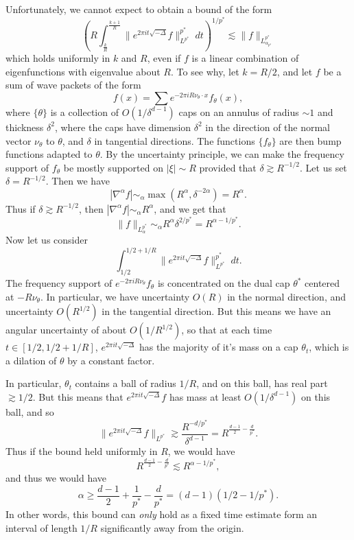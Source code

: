 \begin{itemize}
    Unfortunately, we cannot expect to obtain a bound of the form
    \[ \left( R \int_{\frac{k}{R}}^{\frac{k + 1}{R}} \| e^{2 \pi i t \sqrt{-\Delta}} f \|_{L^{p^*}}^{p^*}\; dt \right)^{1/p^*} \lesssim \| f \|_{L^{p^*}_{\alpha_{p^*}}} \]
    which holds uniformly in $k$ and $R$, even if $f$ is a linear combination of eigenfunctions with eigenvalue about $R$. To see why, let $k = R/2$, and let $f$ be a sum of wave packets of the form
    \[ f(x) = \sum e^{- 2 \pi i R \nu_\theta \cdot x} f_\theta(x), \]
    where $\{ \theta \}$ is a collection of $O(1/\delta^{d-1})$ caps on an annulus of radius $\sim 1$ and thickness $\delta^2$, where the caps have dimension $\delta^2$ in the direction of the normal vector $\nu_\theta$ to $\theta$, and $\delta$ in tangential directions. The functions $\{ f_\theta \}$ are then bump functions adapted to $\theta$. By the uncertainty principle, we can make the frequency support of $f_\theta$ be mostly supported on $|\xi| \sim R$ provided that $\delta \gtrsim R^{-1/2}$. Let us set $\delta = R^{-1/2}$. Then we have
    \[ |\nabla^\alpha f| \sim_\alpha \max(R^\alpha,\delta^{-2\alpha}) = R^\alpha. \]
    Thus if $\delta \gtrsim R^{-1/2}$, then $|\nabla^\alpha f| \sim_\alpha R^\alpha$, and we get that
    \[ \| f \|_{L^{p^*}_\alpha} \sim_\alpha R^\alpha \delta^{2/p^*} = R^{\alpha - 1/p^*}. \]
    Now let us consider
    \[ \int_{1/2}^{1/2 + 1/R} \| e^{2 \pi i t \sqrt{-\Delta}} f \|_{L^{p^*}}^{p^*}\; dt. \]
    The frequency support of $e^{-2 \pi i R \nu_\theta} f_\theta$ is concentrated on the dual cap $\theta^*$ centered at $-  R \nu_\theta$. In particular, we have uncertainty $O(R)$ in the normal direction, and uncertainty $O(R^{1/2})$ in the tangential direction. But this means we have an angular uncertainty of about $O(1/R^{1/2})$, so that at each time $t \in [1/2, 1/2 + 1/R]$, $e^{2 \pi i t \sqrt{-\Delta}}$ has the majority of it's mass on a cap $\theta_t$, which is a dilation of $\theta$ by a constant factor.

    In particular, $\theta_t$ contains a ball of radius $1/R$, and on this ball, has real part $\gtrsim 1/2$. But this means that $e^{2 \pi i t \sqrt{-\Delta}} f$ has mass at least $O(1/\delta^{d-1})$ on this ball, and so
    \[ \| e^{2 \pi i t \sqrt{-\Delta}} f \|_{L^{p^*}} \gtrsim \frac{R^{-d/p^*}}{\delta^{d-1}} = R^{ \frac{d-1}{2} - \frac{d}{p^*} }. \]
    Thus if the bound held uniformly in $R$, we would have
    \[ R^{ \frac{d-1}{2} - \frac{d}{p^*} } \lesssim R^{\alpha - 1/p^*}, \]
    and thus we would have
    \[ \alpha \geq \frac{d-1}{2} + \frac{1}{p^*} - \frac{d}{p^*} = (d-1) \left( 1/2 - 1/p^* \right). \]
    In other words, this bound can \emph{only} hold as a fixed time estimate form an interval of length $1/R$ significantly away from the origin.


\end{itemize}
